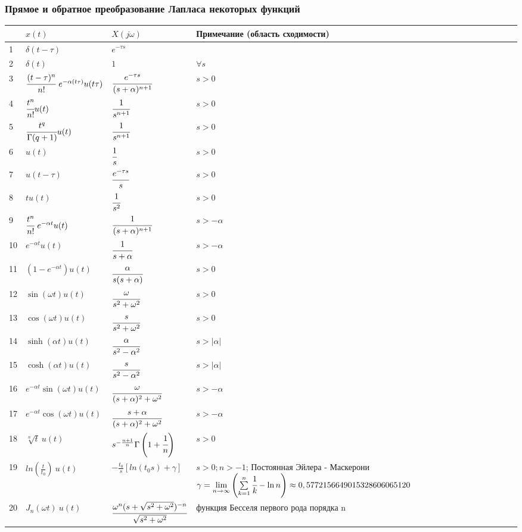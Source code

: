 \documentclass[12pt, a4paper]{article}
\begin{document}
\subsubsection{Прямое и обратное преобразование Лапласа некоторых функций}
\begin{tabular}[c]{|p{0.3cm}|p{4.5cm}|p{4.5cm}|p{6cm}|}
\hline
 & $x(t)$ & $X(j\omega)$ & Примечание (область сходимости) \\ \hline
1 & $ \delta(t-\tau) $ & $ e^{-\tau s} $ & \\ \hline
2 & $ \delta(t) $ & $ 1 $ & $\forall s$ \\ \hline
3 & $ \cfrac{(t-\tau)^n}{n!}\ e^{-\alpha(t\tau)}u(t\tau) $ & $ \cfrac{e^{-\tau s}}{(s+\alpha)^{n+1}} $ & $ s>0$ \\ \hline
4 & $ \cfrac{t^n}{n!} u(t) $ & $ \cfrac{1}{s^{n+1}} $ & $s>0$ \\ \hline
5 & $ \cfrac{t^q}{\Gamma(q+1)} u(t) $ & $ \cfrac{1}{s^{n+1}} $ & $s>0$ \\ \hline
6 & $ u(t) $ & $ \cfrac{1}{s} $ &  $s>0$ \\ \hline
7 & $ u(t-\tau) $ & $ \cfrac{e^{-\tau s}}{s} $ & $s>0$ \\ \hline
8 & $ t u(t) $ & $ \cfrac{1}{s^2} $ &  $s>0$ \\ \hline
9 & $ \cfrac{t^n}{n!}\ e^{-\alpha t} u(t) $ & $ \cfrac{1}{(s+\alpha)^{n+1}} $ &  $s>-\alpha$  \\ \hline
10 & $ e^{-\alpha t} u(t) $ & $ \cfrac{1}{s+\alpha} $ &  $s>-\alpha$ \\ \hline
11 & $ (1-e^{-\alpha t}) u(t) $ & $ \cfrac{\alpha}{s(s+\alpha)} $ & $s>0$  \\ \hline
12 & $ \sin(\omega t) u(t) $ & $ \cfrac{\omega}{s^2+\omega^2} $ &  $s>0$ \\ \hline
13 & $ \cos(\omega t) u(t) $ & $ \cfrac{s}{s^2+\omega^2} $ &  $s>0$ \\ \hline
14 & $ \sinh(\alpha t) u(t) $ & $ \cfrac{\alpha}{s^2 - \alpha^2} $ & $s>|\alpha|$  \\ \hline
15 & $ \cosh(\alpha t) u(t) $ & $ \cfrac{s}{s^2 - \alpha^2}$ &  $s>|\alpha|$ \\ \hline
16 & $ e^{-\alpha t} \sin(\omega t) u(t) $ & $ \cfrac{\omega}{(s+\alpha)^2+\omega^2} $ & $s>-\alpha$ \\ \hline
17 & $ e^{-\alpha t} \cos(\omega t) u(t) $ & $ \cfrac{s+\alpha}{(s+\alpha)^2+\omega^2} $ & $s>-\alpha$ \\ \hline
18 & $ \sqrt[n]{t}\ u(t) $ & $ s^{-\frac{n+1}{n}}\Gamma \left( 1+\cfrac{1}{n} \right) $ &  $s>0$  \\ \hline
19 & $ ln(\frac{t}{t_0})\ u(t) $ & $ -\frac{t_0}{s} \left[ ln(t_0 s) + \gamma \right] $ &  $s>0; n>-1$; Постоянная Эйлера - Маскерони $\gamma = \lim\limits_{n \to \infty}{\left( \sum\limits_{k=1}^{n}{ \cfrac{1}{k} - \ln n }\right)} \approx 0,57721 56649 01532 86060 65120$ \\ \hline
20 & $ J_n(\omega t)\ u(t) $ & $ \cfrac{\omega
^n(s+\sqrt{s^2+\omega^2})^{-n}}{\sqrt{s^2+\omega^2}}  $ & функция Бесселя первого рода порядка n \\ \hline
\end{tabular}
\end{document}
